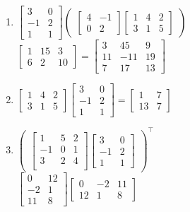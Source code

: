 \documentclass[12pt, a4paper, onecolumn, oneside, final, bahasa]{report}
\begin{document}
\begin{enumerate}
\def\labelenumi{\arabic{enumi}.}
\setcounter{enumi}{7}
\item
  \(\begin{bmatrix} 3 & 0 \\ -1 & 2 \\ 1 & 1 \end{bmatrix} \begin{pmatrix} \begin{bmatrix} 4 & -1 \\ 0 & 2 \end{bmatrix} \begin{bmatrix} 1 & 4 & 2 \\ 3 & 1 & 5 \end{bmatrix} \end{pmatrix}\)\\
  \(\begin{bmatrix} 1 & 15 & 3 \\ 6 & 2 & 10 \end{bmatrix} =\begin{bmatrix} 3 & 45 & 9 \\ 11 & -11 & 19 \\ 7 & 17 & 13 \end{bmatrix}\)
\item
  \(\begin{bmatrix} 1 & 4 & 2 \\ 3 & 1 & 5 \end{bmatrix} \begin{bmatrix} 3 & 0 \\ -1 & 2 \\ 1 & 1 \end{bmatrix} =\begin{bmatrix} 1 & 7 \\ 13 & 7 \end{bmatrix}\)
\item
  \(\begin{pmatrix} \begin{bmatrix} 1 & 5 & 2 \\ -1 & 0 & 1 \\ 3 & 2 & 4 \\ \end{bmatrix} \begin{bmatrix} 3 & 0 \\ -1 & 2 \\ 1 & 1 \end{bmatrix} \end{pmatrix}^\intercal\)\\
  \(\begin{bmatrix} 0 & 12\\ -2 & 1 \\ 11 & 8 \end{bmatrix} \begin{bmatrix} 0 & -2 & 11\\ 12 & 1 & 8 \end{bmatrix}\)

\end{enumerate}
\end{document}
